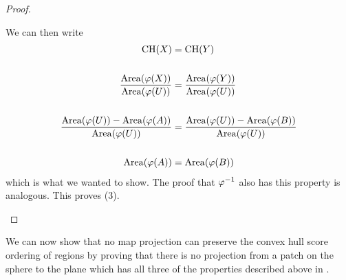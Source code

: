 \begin{proof}
\begin{enumerate}
We can then write 
\begin{align*}
\mathrm{CH}(X) &= \mathrm{CH}(Y)\\
\ &\\
\frac{\mathrm{Area}(\varphi(X))}{\mathrm{Area}(\varphi(U))} &= \frac{\mathrm{Area}(\varphi(Y))}{\mathrm{Area}(\varphi(U))}\\
\ &\\
\frac{\mathrm{Area}(\varphi(U)) - \mathrm{Area}(\varphi(A))}{\mathrm{Area}(\varphi(U))} &= \frac{\mathrm{Area}(\varphi(U)) - \mathrm{Area}(\varphi(B))}{\mathrm{Area}(\varphi(U))}\\
\ &\\
\mathrm{Area}(\varphi(A)) &= \mathrm{Area}(\varphi(B))
\end{align*}
 which is what we wanted to show.  The proof that $\varphi^{-1}$ also has this property is analogous.  This proves (3).
\end{enumerate}
\end{proof}

We can now show that no map projection can preserve the convex hull score ordering of regions by proving that there is no projection from a patch on the sphere to the plane which has all three of the properties described above in . 


